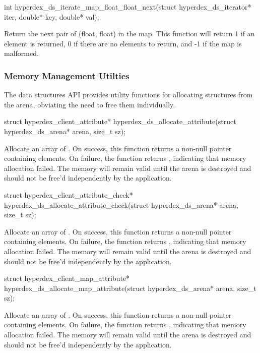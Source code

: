 \funcsep
\begin{ccode}
int hyperdex_ds_iterate_map_float_float_next(struct hyperdex_ds_iterator* iter,
                                             double* key, double* val);
\end{ccode}
\funcdesc Return the next pair of (float, float) in the map.  This function will
return 1 if an element is returned, 0 if there are no elements to return, and -1
if the map is malformed.

\subsubsection{Memory Management Utilties}
\label{sec:api:c:client:memory}

The data structures API provides utility functions for allocating structures
from the arena, obviating the need to free them individually.

\funcsep
\begin{ccode}
struct hyperdex_client_attribute*
hyperdex_ds_allocate_attribute(struct hyperdex_ds_arena* arena, size_t sz);
\end{ccode}
\funcdesc Allocate an array of .  On
success, this function returns a non-null pointer containing  elements.
On failure, the function returns , indicating that memory allocation
failed.  The memory will remain valid until the arena is destroyed and should
not be free'd independently by the application.

\funcsep
\begin{ccode}
struct hyperdex_client_attribute_check*
hyperdex_ds_allocate_attribute_check(struct hyperdex_ds_arena* arena, size_t sz);
\end{ccode}
\funcdesc Allocate an array of .
On success, this function returns a non-null pointer containing 
elements.  On failure, the function returns , indicating that memory
allocation failed.  The memory will remain valid until the arena is destroyed
and should not be free'd independently by the application.

\funcsep
\begin{ccode}
struct hyperdex_client_map_attribute*
hyperdex_ds_allocate_map_attribute(struct hyperdex_ds_arena* arena, size_t sz);
\end{ccode}
\funcdesc Allocate an array of .
On success, this function returns a non-null pointer containing 
elements.  On failure, the function returns , indicating that memory
allocation failed.  The memory will remain valid until the arena is destroyed
and should not be free'd independently by the application.

